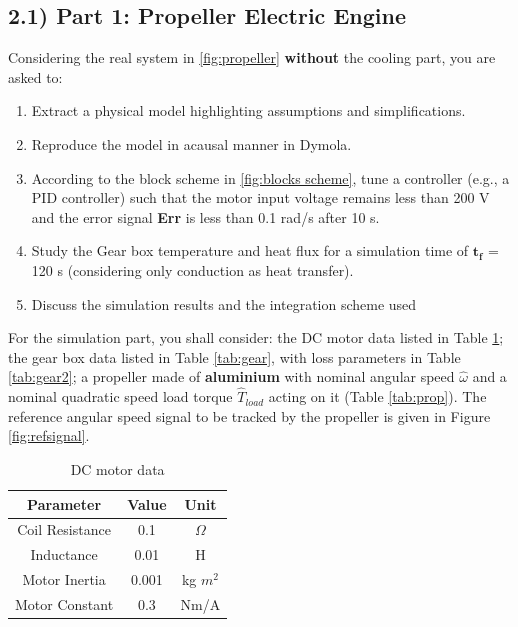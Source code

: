 \documentclass[11pt,a4paper,oneside]{article}
\begin{document}
\subsection*{2.1) Part 1: Propeller Electric Engine}
Considering the real system in \ref{fig:propeller} \textbf{without} the cooling part, you are asked to:
\begin{enumerate}
    \item Extract a physical model highlighting assumptions and simplifications.    
    \item Reproduce the model in acausal manner in Dymola.
    \item According to the block scheme in \ref{fig:blocks scheme}, tune a controller (e.g., a PID controller) such that the motor input voltage remains less than 200 V and the error signal \textbf{Err} is less than 0.1 rad/s after 10 s. 
    \item Study the Gear box temperature and heat flux for a simulation time of $\mathbf{t_f}$ = 120 s (considering only conduction as heat transfer).
    \item Discuss the simulation results and the integration scheme used
\end{enumerate}

For the simulation part, you shall consider: the DC motor data listed in Table \ref{tab:dc}; the gear box data listed in Table \ref{tab:gear}, with loss parameters in Table \ref{tab:gear2}; a propeller made of \textbf{aluminium} with nominal angular speed $\hat{\omega}$ and a nominal quadratic speed load torque $\hat{T}_{load}$ acting on it (Table \ref{tab:prop}).
The reference angular speed signal to be tracked by the propeller is given in Figure \ref{fig:refsignal}. 

\begin{table}[ht!]
    \centering
    \caption{DC motor data}
    \begin{tabular}{ |c|c|c| } 
        \hline
        \textbf{Parameter} & \textbf{Value} & \textbf{Unit}\\
        \hline
        Coil Resistance & 0.1 & $\Omega$  \\ 
        Inductance & 0.01 & H  \\ 
        Motor Inertia & 0.001 & kg $m^2$  \\ 
        Motor Constant & 0.3 & Nm/A \\ 
        \hline
    \end{tabular}
    \label{tab:dc}
\end{table}
\end{document}
